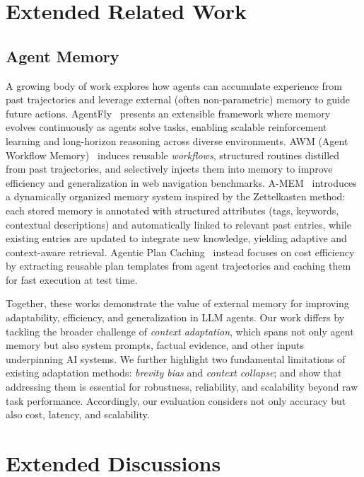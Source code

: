 \section{Extended Related Work}

\subsection{Agent Memory}

A growing body of work explores how agents can accumulate experience from past trajectories and leverage external (often non-parametric) memory to guide future actions. 
AgentFly~\citep{zhou2025agentfly} presents an extensible framework where memory evolves continuously as agents solve tasks, enabling scalable reinforcement learning and long-horizon reasoning across diverse environments. 
AWM (Agent Workflow Memory)~\citep{wang2024agent} induces reusable \emph{workflows}, \ie structured routines distilled from past trajectories, and selectively injects them into memory to improve efficiency and generalization in web navigation benchmarks. 
A-MEM~\citep{xu2025mem} introduces a dynamically organized memory system inspired by the Zettelkasten method: each stored memory is annotated with structured attributes (\eg tags, keywords, contextual descriptions) and automatically linked to relevant past entries, while existing entries are updated to integrate new knowledge, yielding adaptive and context-aware retrieval. 
Agentic Plan Caching~\citep{zhang2025cost} instead focuses on cost efficiency by extracting reusable plan templates from agent trajectories and caching them for fast execution at test time. 

Together, these works demonstrate the value of external memory for improving adaptability, efficiency, and generalization in LLM agents. 
Our work differs by tackling the broader challenge of \emph{context adaptation}, which spans not only agent memory but also system prompts, factual evidence, and other inputs underpinning AI systems. 
We further highlight two fundamental limitations of existing adaptation methods: \textit{brevity bias} and \textit{context collapse}; and show that addressing them is essential for robustness, reliability, and scalability beyond raw task performance. 
Accordingly, our evaluation considers not only accuracy but also cost, latency, and scalability.

\section{Extended Discussions}

